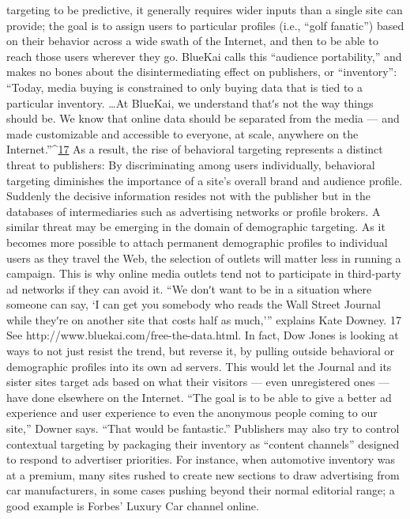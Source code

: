 targeting to be predictive, it generally requires wider inputs than a single
site can provide; the goal is to assign users to particular profiles (i.e., ``golf
fanatic'') based on their behavior across a wide swath of the Internet, and
then to be able to reach those users wherever they go. BlueKai calls this
``audience portability,'' and makes no bones about the disintermediating
effect on publishers, or ``inventory'':
``Today, media buying is constrained to only buying data that is
tied to a particular inventory. \ldots  At BlueKai, we understand thatʹs
not the way things should be. We know that online data should be
separated from the media — and made customizable and accessible
to everyone, at scale, anywhere on the Internet.''^{\href{#endnotes}{17}}
As a result, the rise of behavioral targeting represents a distinct threat to
publishers: By discriminating among users individually, behavioral
targeting diminishes the importance of a site’s overall brand and audience
profile. Suddenly the decisive information resides not with the publisher
but in the databases of intermediaries such as advertising networks or
profile brokers. A similar threat may be emerging in the domain of
demographic targeting. As it becomes more possible to attach permanent
demographic profiles to individual users as they travel the Web, the
selection of outlets will matter less in running a campaign.
This is why online media outlets tend not to participate in third‐party ad
networks if they can avoid it. ``We donʹt want to be in a situation where
someone can say, ‘I can get you somebody who reads the Wall Street
Journal while theyʹre on another site that costs half as much,’'' explains
Kate Downey.
17 See http://www.bluekai.com/free-the-data.html.
In fact, Dow Jones is looking at ways to not just resist the trend, but
reverse it, by pulling outside behavioral or demographic profiles into its
own ad servers. This would let the Journal and its sister sites target ads
based on what their visitors — even unregistered ones — have done
elsewhere on the Internet. ``The goal is to be able to give a better ad
experience and user experience to even the anonymous people coming to
our site,'' Downer says. ``That would be fantastic.''
Publishers may also try to control contextual targeting by packaging their
inventory as ``content channels'' designed to respond to advertiser
priorities. For instance, when automotive inventory was at a premium,
many sites rushed to create new sections to draw advertising from car
manufacturers, in some cases pushing beyond their normal editorial
range; a good example is Forbes’ Luxury Car channel online.
